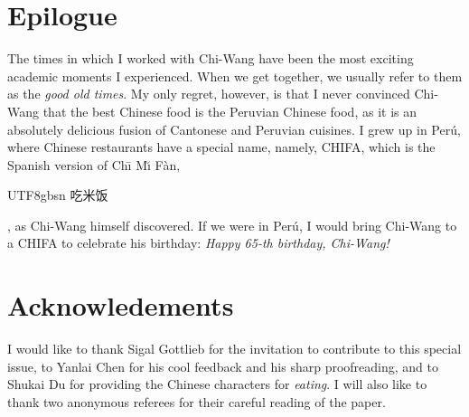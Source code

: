\documentclass[bpam,reqno]{ipart}
\begin{document}
\section{Epilogue}
The times in which I worked with Chi-Wang have been the most exciting academic moments I experienced. When we get 
together, we usually refer to them as the {\it good old times}. 
My only regret, however, is that I never convinced Chi-Wang that the best Chinese food is the Peruvian Chinese food, as it is an absolutely delicious fusion of Cantonese and Peruvian cuisines. I grew up in Per\'u, where Chinese restaurants have a special name, namely, CHIFA, which is the Spanish version of Ch\={\i} M\u{\i} F\`an, \begin{CJK*}{UTF8}{gbsn}
吃米饭
\end{CJK*} ,
as Chi-Wang himself discovered. If we were in Per\'u, I would bring Chi-Wang to a CHIFA to celebrate his birthday: {\it Happy 65-th birthday, Chi-Wang!}


\section*{Acknowledements} I would like to thank Sigal Gottlieb for the invitation to contribute to this special issue, to Yanlai Chen for his cool feedback and his sharp proofreading, and to Shukai Du for providing the Chinese characters for {\it eating}. {I  will also like to thank two anonymous referees for their careful reading of the paper.} 

%
%
\end{document}
